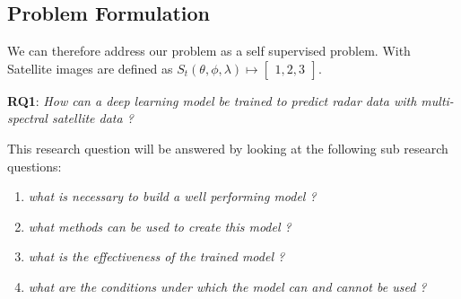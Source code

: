 \documentclass[acmtog, authorversion]{acmart}
\begin{document}


\subsection{Problem Formulation}
We can therefore address our problem as a self supervised problem.
With Satellite images are defined as $S_t(\theta,\phi,\lambda) \mapsto \begin{bmatrix} 1, 2, 3\end{bmatrix}$.


\textbf{RQ1}: \textit{How can a deep learning model be trained to predict radar data with multi-spectral satellite data ?}
\smallskip

This research question will be answered by looking at the following sub research questions:
\begin{enumerate}
    \item \textit{what is necessary to build a well performing model ?}
    \item \textit{what methods can be used to create this model ?}
    \item \textit{what is the effectiveness of the trained model ?}
    \item \textit{what are the conditions under which the model can and cannot be used ?}
\end{enumerate}
\end{document}
